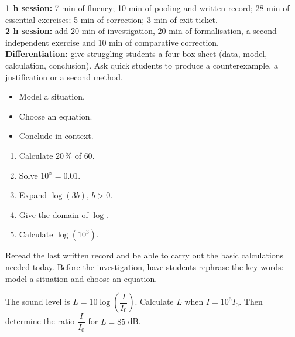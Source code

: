 \ifprof\clearpage
\begin{methode}
\textbf{1 h session:} 7 min of fluency; 10 min of pooling and written record; 28 min of essential exercises; 5 min of correction; 3 min of exit ticket.\\
\textbf{2 h session:} add 20 min of investigation, 20 min of formalisation, a second independent exercise and 10 min of comparative correction.\\
\textbf{Differentiation:} give struggling students a four-box sheet (data, model, calculation, conclusion). Ask quick students to produce a counterexample, a justification or a second method.
\end{methode}
\fi
{}
\begin{objectifs}\begin{itemize}\item Model a situation.\item Choose an equation.\item Conclude in context.\end{itemize}\end{objectifs}
\begin{automatismes}\begin{enumerate}\item Calculate $20\,\%$ of $60$. \item Solve $10^x=0.01$. \item Expand $\log(3b)$, $b>0$. \item Give the domain of $\log$. \rep{$]0,+\infty[$}\item Calculate $\log(10^3)$. \end{enumerate}\end{automatismes}
\begin{prerequis}Reread the last written record and be able to carry out the basic calculations needed today. Before the investigation, have students rephrase the key words: model a situation and choose an equation.\end{prerequis}

\begin{activite}
The sound level is $L=10\log\!\left(\dfrac I{I_0}\right)$. Calculate $L$ when $I=10^6I_0$. Then determine the ratio $\dfrac I{I_0}$ for $L=85$ dB.

\end{activite}

